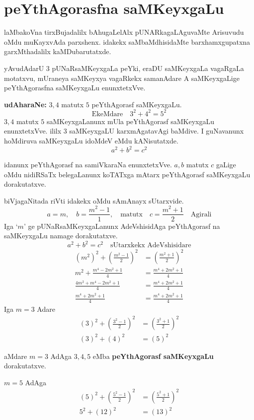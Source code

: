 \chapter{peYthAgorasfna saMKeyxgaLu}
\vskip -20pt

laMbakoVna tirxBujadalilx bAhugaLelAlx pUNARkagaLAguvaMte Arisuvudu oMdu muKayxvAda parxshenx. idakekx saMbaMdhisidaMte barxhamxgupatxna garxMthadalilx kaMDubarutatxde.

yAvudAdarU $3$ pUNaRsaMKeyxgaLa peYki, eraDU saMKeyxgaLa vagaRgaLa motatxvu, mUraneya saMKeyxya vagaRkekx samanAdare A saMKeyxgaLige peYthAgorasfna saMKeyxgaLu enunxtetxVve.

\textbf{udAharaNe:} $3,4$ matutx $5$  peYthAgorasf saMKeyxgaLu.
$$
\text{EkeMdare}\quad 3^2+4^2=5^2
$$
$3,4$ matutx $5$ saMKeyxgaLanunx mUla peYthAgorasf saMKeyxgaLu enunxtetxVve. ililx $3$ saMKeyx\-gaLU karxmAgatavAgi baMdive. I guNavanunx hoMdiruva saMKeyxgaLu idoMdeV eMdu kANisutatxde.
$$
a^2+b^2 = c^2
$$

idanunx peYthAgorasf  na samiVkaraNa enunxtetxVve. $a,b$ matutx $c$ gaLige oMdu nidiRSaTx belegaLanunx koTATxga mAtarx peYthAgorasf saMKeyxgaLu dorakutatxve.

biVjagaNitada riVti idakekx oMdu sAmAnayx sUtarxvide.
$$
a=m, \quad b= \frac{m^2-1}{1}, \quad\text{matutx} \quad c=\frac{m^2+1}{2} \quad \text{Agirali}
$$
Iga `$m$' ge pUNaRsaMKeyxgaLanunx AdeVshisidAga peYthAgorasf na saMKeyxgaLu namage dorakutatxve.
$$
a^2+b^2=c^2 \quad\text{sUtarxkekx AdeVshisidare}
$$
\begin{align*}
\left(m^2\right)^2+\left(\frac{m^2-1}{2}\right)^2 &= \left(\frac{m^2+1}{2}\right)^2\\
m^2+ \frac{m^4-2m^2+1}{4} &= \frac{m^4+2m^2+1}{4}\\
\frac{4m^2+m^4-2m^2+1}{4} &= \frac{m^4+2m^2+1}{4}\\
\frac{m^4+2m^2+1}{4} &= \frac{m^4+2m^2+1}{4}
\end{align*}
Iga $m=3$ Adare
\begin{align*}
(3)^2+\left(\frac{3^{2}-1}{2}\right)^2 &= \left(\frac{3^2+1}{2}\right)^2\\
(3)^2+(4)^2 &= (5)^2
\end{align*}

aMdare $m=3$ AdAga $3,4,5$ eMba {\bf peYthAgorasf saMKeyxgaLu} dorakutatxve.

$m=5$ \quad AdAga
\begin{align*}
(5)^2 + \left(\frac{5^2-1}{2}\right)^2 &= \left(\frac{5^2+1}{2}\right)^2\\
5^2 +(12)^2 &= (13)^2
\end{align*}

